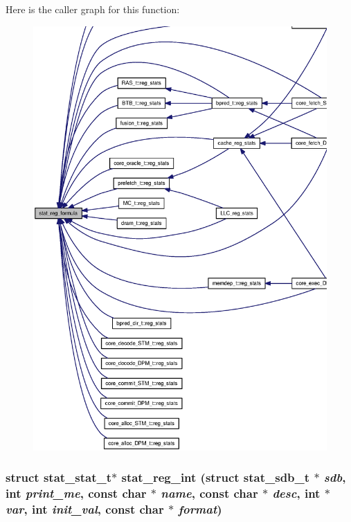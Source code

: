 Here is the caller graph for this function:\nopagebreak
\begin{figure}[H]
\begin{center}
\leavevmode
\includegraphics[width=338pt]{zesto_2stats_8h_f2f491659903b1b21de69fe6c767a64a_icgraph}
\end{center}
\end{figure}
\subsubsection[{stat\_\-reg\_\-int}]{\setlength{\rightskip}{0pt plus 5cm}struct {\bf stat\_\-stat\_\-t}$\ast$ stat\_\-reg\_\-int (struct {\bf stat\_\-sdb\_\-t} $\ast$ {\em sdb}, \/  int {\em print\_\-me}, \/  const char $\ast$ {\em name}, \/  const char $\ast$ {\em desc}, \/  int $\ast$ {\em var}, \/  int {\em init\_\-val}, \/  const char $\ast$ {\em format})\hspace{0.3cm}{\tt  [read]}}\label{zesto_2stats_8h_29b54a586f4845a6bb5dabbe04ad43be}





